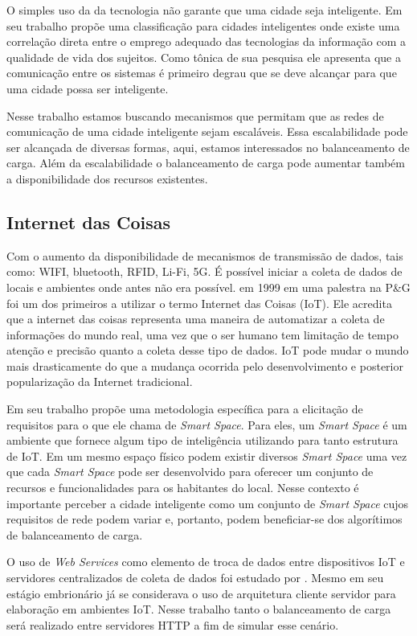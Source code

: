 \documentclass[12pt]{article}
\begin{document}
O simples uso da da tecnologia não garante que uma cidade seja inteligente. Em seu trabalho \cite{Anttiroiko2014} propõe uma classificação para cidades inteligentes onde existe uma correlação direta entre o emprego adequado das tecnologias da informação com a qualidade de vida dos sujeitos. Como tônica de sua pesquisa ele apresenta que a comunicação entre os sistemas é primeiro degrau que se deve alcançar para que uma cidade possa ser inteligente.

Nesse trabalho estamos buscando mecanismos que permitam que as redes de comunicação de uma cidade inteligente sejam escaláveis. Essa escalabilidade pode ser alcançada de diversas formas, aqui, estamos interessados no balanceamento de carga. Além da escalabilidade o balanceamento de carga pode aumentar também a disponibilidade dos recursos existentes.

\subsection{Internet das Coisas}

Com o aumento da disponibilidade de mecanismos de transmissão de dados, tais como: WIFI, bluetooth, RFID, Li-Fi, 5G. É possível iniciar a coleta de dados de locais e ambientes onde antes não era possível. \cite{Ashton2009}  em 1999 em uma palestra na P&G foi um dos primeiros a utilizar o termo Internet das Coisas (IoT). Ele  acredita que a internet das coisas representa uma maneira de automatizar a coleta de informações do mundo real, uma vez que o ser humano tem limitação de tempo atenção e precisão quanto a coleta desse tipo de dados. IoT pode mudar o mundo mais drasticamente do que a mudança ocorrida pelo desenvolvimento e posterior popularização da Internet tradicional. 

Em seu trabalho \cite{Aziz2016} propõe uma metodologia específica para a elicitação de requisitos para o que ele chama de \textit{Smart Space}. Para eles, um \textit{Smart Space} é um ambiente que fornece algum tipo de inteligência utilizando para tanto estrutura de IoT. Em um mesmo espaço físico podem existir diversos \textit{Smart Space} uma vez que cada \textit{Smart Space} pode ser desenvolvido para oferecer um conjunto de recursos e funcionalidades para os habitantes do local. Nesse contexto é importante perceber a cidade inteligente como um conjunto de \textit{Smart Space} cujos requisitos de rede podem variar e, portanto, podem beneficiar-se dos algorítimos de balanceamento de carga.

O uso de \textit{Web Services} como elemento de troca de dados entre dispositivos IoT e servidores centralizados de coleta de dados foi estudado por \cite{Glombitza2010}. Mesmo em seu estágio embrionário já se considerava o uso de arquitetura cliente servidor para elaboração em ambientes IoT. Nesse trabalho tanto o balanceamento de carga será realizado entre servidores HTTP a fim de simular esse cenário.
\end{document}
